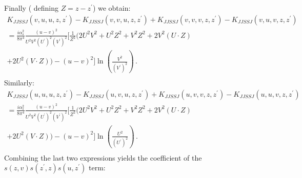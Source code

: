 \documentclass[11pt,a4paper]{article}
\begin{document}
Finally ( defining $Z=z-z^{\prime}$) we obtain:
\begin{eqnarray}
K_{JJSSJ}(v,u,u,z,z^{\prime})-K_{JJSSJ}(v,v,u,z,z^{\prime})+K_{JJSSJ}(v,v,v,z,z^{\prime})-K_{JJSSJ}(v,u,v,z,z^{\prime})\nonumber \\
=\frac{i\alpha_{s}^{2}}{8\pi^{4}}\frac{(u-v)^{2}}{U^{2}V^{2}(U^{\prime})^{2}(V^{\prime})^{2}}\Big[\frac{1}{Z^{2}}(2U^{2}V^{2}+U^{2}Z^{2}+V^{2}Z^{2}+2V^{2}(U\cdot Z)
\nonumber \\
 +2U^{2}(V\cdot Z))-(u-v)^{2}\Big] \ln\left(\frac{V^{2}}{(V^{\prime})^{2}}\right)\,. \nonumber \\
 \end{eqnarray}
Similarly:
\begin{eqnarray}
K_{JJSSJ}(u,u,u,z,z^{\prime})-K_{JJSSJ}(u,v,u,z,z^{\prime})+K_{JJSSJ}(u,v,v,z,z^{\prime})-K_{JJSSJ}(u,u,v,z,z^{\prime})\nonumber \\
=\frac{i\alpha_{s}^{2}}{8\pi^{4}}\frac{(u-v)^{2}}{U^{2}V^{2}(U^{\prime})^{2}(V^{\prime})^{2}}\Big[\frac{1}{Z^{2}}(2U^{2}V^{2}+U^{2}Z^{2}+V^{2}Z^{2}+2V^{2}(U\cdot Z)
\nonumber \\ +2U^{2}(V\cdot Z))-(u-v)^{2}\Big]\ln\left(\frac{U^{2}}{(U^{\prime})^{2}}\right)\,. \nonumber \\
\end{eqnarray}
Combining the last two expressions yields the coefficient of the $s(z,v)s(z^{\prime},z)s(u,z^{\prime})$ term:
\end{document}
